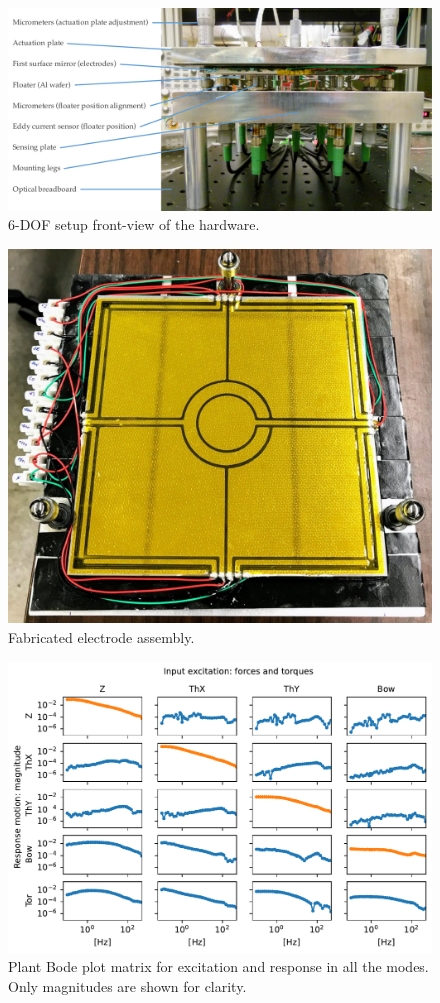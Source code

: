 \documentclass[letterpaper,10pt,onecolumn]{aspe}
\begin{document}
\newpage

\begin{figure}
    \centering
    \includegraphics[width=1\linewidth]{6-DOF_setup_labels_v2.pdf}
    \caption[]{6-DOF setup front-view of the hardware.}\label{fig:6-DOF_setup}
\end{figure}

\begin{figure}
    \centering
    \includegraphics[width=0.65\linewidth]{electrodes_fabricated.jpg}
    \caption[]{Fabricated electrode assembly.}\label{fig:electrodes_fabricated}
\end{figure}

\begin{figure}
    \centering
    \includegraphics[width=1\linewidth]{Plant_BodeMagMatrix.pdf}
    \caption[]{Plant Bode plot matrix for excitation and response in all the modes. Only magnitudes are shown for clarity.}\label{fig:plant_BodeMatrix}
\end{figure}
\end{document}
